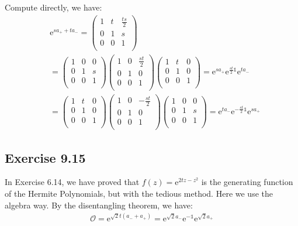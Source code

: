 \documentclass[]{ctexart}
\newcommand{\me}{\mathrm{e}}
\begin{document}
		Compute directly, we have:
			\begin{equation*}
			\begin{aligned}
				&\me ^{sa_++ta_-}=
				\begin{pmatrix}
				1 &  t & \frac{ts}{2} \\
				0 & 1 & s \\
				0 & 0 & 1 \\
				\end{pmatrix}\\
				&=
				\begin{pmatrix}
				1 &  0 & 0 \\
				0 & 1 & s \\
				0 & 0 & 1 \\
				\end{pmatrix}
				\begin{pmatrix}
				1 &  0 & \frac{st}{2} \\
				0 & 1 & 0 \\
				0 & 0 & 1 \\
				\end{pmatrix}
				\begin{pmatrix}
				1 &  t & 0 \\
				0 & 1 & 0 \\
				0 & 0 & 1 \\
				\end{pmatrix}=\me^{sa_+}\me^{\frac{st}{2}\mathds{1}}\me^{ta_-}\\
				&=\begin{pmatrix}
				1 &  t & 0 \\
				0 & 1 & 0 \\
				0 & 0 & 1 \\
				\end{pmatrix}
				\begin{pmatrix}
				1 &  0 & -\frac{st}{2} \\
				0 & 1 & 0 \\
				0 & 0 & 1 \\
				\end{pmatrix}
				\begin{pmatrix}
				1 &  0 & 0 \\
				0 & 1 & s \\
				0 & 0 & 1 \\
				\end{pmatrix}
				=\me^{ta_-}\me^{-\frac{st}{2}\mathds{1}}\me^{sa_+}
			\end{aligned}
			\end{equation*}
			
	\subsection{Exercise 9.15}
		In Exercise 6.14, we have proved that $f(z)=\me ^{2tz-z^2}$ is the generating function of the Hermite Polynomials, but with the tedious method. Here we use the algebra way. By the disentangling theorem, we have:
			\begin{equation*}
			\begin{aligned}
				\mathcal{O}=\me^{\sqrt{2}t(a_-+a_+)}=\me^{\sqrt{2}a_-}\me^{-\mathds{1}}\me^{\sqrt{2}a_+}
			\end{aligned}
			\end{equation*}
		
\end{document}

